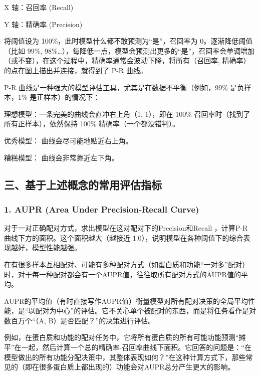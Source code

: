 X 轴：召回率 (Recall)

Y 轴：精确率 (Precision)

将阈值设为 100\%，此时模型什么都不敢预测为``是''，召回率为 0。逐渐降低阈值（比如 99\%, 98\%\ldots），每降低一点，模型会预测出更多的``是''，召回率会单调增加（或不变），在这个过程中，精确率通常会波动下降，将所有（召回率, 精确率）的点在图上描出并连接，就得到了 P-R 曲线。

P-R 曲线是一种强大的模型评估工具，尤其是在数据不平衡（例如，99\% 是负样本，1\% 是正样本）的情况下：

理想模型：一条完美的曲线会直冲右上角（1, 1），即在 100\% 召回率时（找到了所有正样本），依然保持 100\% 精确率（一个都没错判）。

优秀模型： 曲线会尽可能地贴近右上角。

糟糕模型： 曲线会非常靠近左下角。

\hypertarget{ux4e09ux57faux4e8eux4e0aux8ff0ux6982ux5ff5ux7684ux5e38ux7528ux8bc4ux4f30ux6307ux6807}{%
\subsection{三、基于上述概念的常用评估指标}\label{ux4e09ux57faux4e8eux4e0aux8ff0ux6982ux5ff5ux7684ux5e38ux7528ux8bc4ux4f30ux6307ux6807}}

\hypertarget{aupr-area-under-precision-recall-curve}{%
\subsubsection{1. AUPR (Area Under Precision-Recall Curve)}\label{aupr-area-under-precision-recall-curve}}

对于一对正确配对方式，求出模型在这对配对下的Precision和Recall ，计算P-R 曲线下方的面积。这个面积越大（越接近 1.0），说明模型在各种阈值下的综合表现越好，模型性能越强。

在有很多样本互相配对、可能有多种配对方式（如蛋白质和功能``一对多''配对）时，对于每一种配对都会有一个AUPR值，往往取所有配对方式的AUPR值的平均。

AUPR的平均值（有时直接写作AUPR值）衡量模型对所有配对决策的全局平均性能，是``以配对为中心''的评估。它不关心单个被配对的东西，而是将任务看作是对数百万个``（A, B）是否匹配？''的决策进行评估。

例如，在蛋白质和功能的配对任务中，它将所有蛋白质的所有可能功能预测``摊平''在一起，然后计算一个总的精确率-召回率曲线下面积。它回答的问题是：``在模型做出的所有功能分配决策中，其整体表现如何？''在这种计算方式下，那些常见的（即在很多蛋白质上都出现的）功能会对AUPR总分产生更大的影响。

